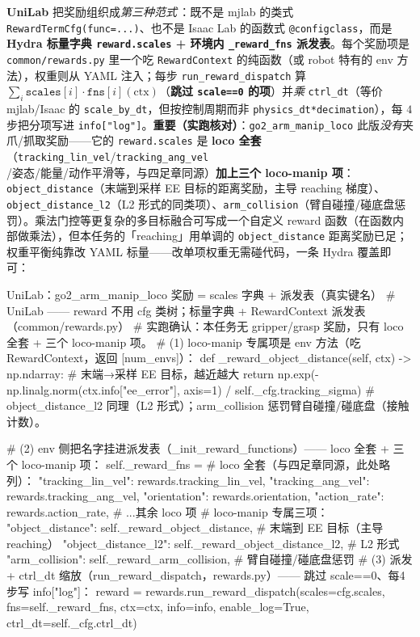 \textbf{UniLab} 把奖励组织成\emph{第三种范式}\,\cite{unilab2026}：既不是 mjlab 的类式 \verb|RewardTermCfg(func=...)|、也不是 Isaac Lab 的函数式 \verb|@configclass|，而是 \textbf{Hydra 标量字典 \texttt{reward.scales} + 环境内 \texttt{\_reward\_fns} 派发表}。每个奖励项是 \verb|common/rewards.py| 里一个吃 \verb|RewardContext| 的纯函数（或 robot 特有的 env 方法），权重则从 YAML 注入；每步 \verb|run_reward_dispatch| 算 $\sum_i \texttt{scales}[i]\cdot\texttt{fns}[i](\text{ctx})$（\textbf{跳过 \texttt{scale==0} 的项}）并\emph{乘} \verb|ctrl_dt|（等价 mjlab/Isaac 的 \verb|scale_by_dt|，但按控制周期而非 \verb|physics_dt*decimation|），每 $4$ 步把分项写进 \verb|info["log"]|。\textbf{重要（实跑核对）}：\verb|go2_arm_manip_loco| 此版\emph{没有}夹爪/抓取奖励——它的 \verb|reward.scales| 是 \textbf{loco 全套}（\verb|tracking_lin_vel|/\verb|tracking_ang_vel|/姿态/能量/动作平滑等，与四足章同源）\textbf{加上三个 loco-manip 项}：\verb|object_distance|（末端到采样 EE 目标的距离奖励，主导 reaching 梯度）、\verb|object_distance_l2|（L2 形式的同类项）、\verb|arm_collision|（臂自碰撞/碰底盘惩罚）。乘法门控等更复杂的多目标融合可写成一个自定义 reward 函数（在函数内部做乘法），但本任务的「reaching」用单调的 \verb|object_distance| 距离奖励已足；权重平衡纯靠改 YAML 标量——改单项权重无需碰代码，一条 Hydra 覆盖即可：

\begin{codebox}[Python]{UniLab：go2\_arm\_manip\_loco 奖励 = scales 字典 + 派发表（真实键名）}
# UniLab —— reward 不用 cfg 类树；标量字典 + RewardContext 派发表（common/rewards.py）
# 实跑确认：本任务无 gripper/grasp 奖励，只有 loco 全套 + 三个 loco-manip 项。
# (1) loco-manip 专属项是 env 方法（吃 RewardContext，返回 [num_envs]）：
def _reward_object_distance(self, ctx) -> np.ndarray:   # 末端→采样 EE 目标，越近越大
    return np.exp(-np.linalg.norm(ctx.info["ee_error"], axis=1) / self._cfg.tracking_sigma)
# object_distance_l2 同理（L2 形式）；arm_collision 惩罚臂自碰撞/碰底盘（接触计数）。

# (2) env 侧把名字挂进派发表（_init_reward_functions）—— loco 全套 + 三个 loco-manip 项：
self._reward_fns = {
    # loco 全套（与四足章同源，此处略列）：
    "tracking_lin_vel": rewards.tracking_lin_vel, "tracking_ang_vel": rewards.tracking_ang_vel,
    "orientation": rewards.orientation, "action_rate": rewards.action_rate,  # ...其余 loco 项
    # loco-manip 专属三项：
    "object_distance":    self._reward_object_distance,    # 末端到 EE 目标（主导 reaching）
    "object_distance_l2": self._reward_object_distance_l2, # L2 形式
    "arm_collision":      self._reward_arm_collision,      # 臂自碰撞/碰底盘惩罚
}
# (3) 派发 + ctrl_dt 缩放（run_reward_dispatch，rewards.py）—— 跳过 scale==0、每4步写 info["log"]：
reward = rewards.run_reward_dispatch(scales=cfg.scales, fns=self._reward_fns, ctx=ctx,
                                     info=info, enable_log=True, ctrl_dt=self._cfg.ctrl_dt)
\end{codebox}

